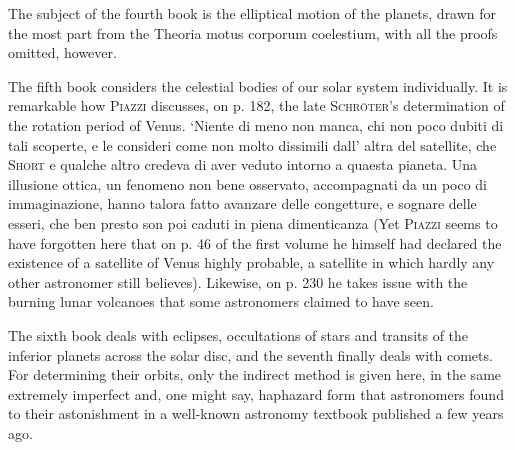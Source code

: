 The subject of the fourth book is the elliptical motion of the planets, drawn for the most part from the Theoria motus corporum coelestium, with all the proofs omitted, however.

The fifth book considers the celestial bodies of our solar system individually. It is remarkable how \textsc{Piazzi} discusses, on p. 182, the late \textsc{Schröter}'s determination of the rotation period of Venus. `Niente di meno non manca, chi non poco dubiti di tali scoperte, e le consideri come non molto dissimili dall' altra del satellite, che \textsc{Short} e qualche altro credeva di aver veduto intorno a quaesta pianeta. Una illusione ottica, un fenomeno non bene osservato, accompagnati da un poco di immaginazione, hanno talora fatto avanzare delle congetture, e sognare delle esseri, che ben presto son poi caduti in piena dimenticanza (Yet \textsc{Piazzi} seems to have forgotten here that on p. 46 of the first volume he himself had declared the existence of a satellite of Venus highly probable, a satellite in which hardly any other astronomer still believes). Likewise, on p. 230 he takes issue with the burning lunar volcanoes that some astronomers claimed to have seen.

The sixth book deals with eclipses, occultations of stars and transits of the inferior planets across the solar disc, and the seventh finally deals with comets. For determining their orbits, only the indirect method is given here, in the same extremely imperfect and, one might say, haphazard form that astronomers found to their astonishment in a well-known astronomy textbook published a few years ago.
\par\clearpage\endgroup

